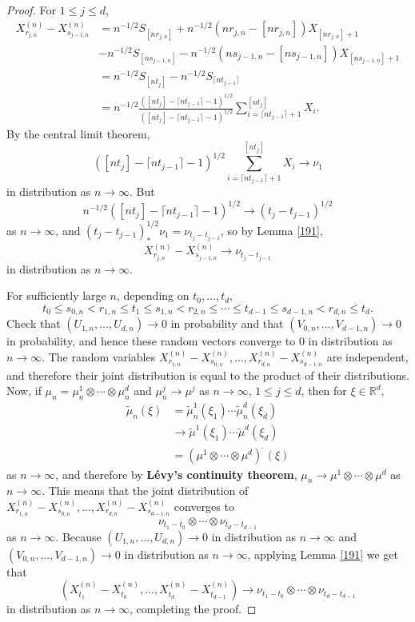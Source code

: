 \documentclass{article}
\theoremstyle{definition}
\theoremstyle{definition}
\begin{document}
\begin{proof}
For $1 \leq j \leq d$, 
\begin{align*}
X^{(n)}_{r_{j,n}} - X^{(n)}_{s_{j-1,n}} &= n^{-1/2} S_{[nr_{j,n}]} + n^{-1/2} (nr_{j,n} - [nr_{j,n}]) X_{[nr_{j,n}]+1}\\
&-n^{-1/2} S_{[ns_{j-1,n}]} - n^{-1/2} (ns_{j-1,n} - [ns_{j-1,n}]) X_{[ns_{j-1,n}]+1}\\
&=n^{-1/2} S_{[nt_j]} - n^{-1/2} S_{\lceil nt_{j-1} \rceil}\\
&=n^{-1/2} \frac{([nt_j] - \lceil nt_{j-1} \rceil - 1)^{1/2}}{([nt_j] - \lceil nt_{j-1} \rceil - 1)^{1/2}} \sum_{i=\lceil nt_{j-1} \rceil+1}^{[nt_j]} X_i.
\end{align*}
By the central limit theorem,
\[
([nt_j] - \lceil nt_{j-1} \rceil - 1)^{1/2}  \sum_{i=\lceil nt_{j-1} \rceil+1}^{[nt_j]} X_i \to \nu_1
\]
in distribution as $n \to \infty$.
But
\[
n^{-1/2} ([nt_j] - \lceil nt_{j-1} \rceil - 1)^{1/2} \to (t_j-t_{j-1})^{1/2}
\]
as $n \to \infty$, and $(t_j-t_{j-1})^{1/2}_* \nu_1 = \nu_{t_j-t_{j-1}}$, 
so by Lemma \ref{191},
\[
X^{(n)}_{r_{j,n}} - X^{(n)}_{s_{j-1,n}}  \to  \nu_{t_j-t_{j-1}}
\]
in distribution as $n \to \infty$. 


For sufficiently large $n$, depending on $t_0,\ldots,t_d$, 
\[
t_0 \leq s_{0,n} < r_{1,n} \leq t_1 \leq s_{1,n} < r_{2,n} \leq \cdots \leq t_{d-1} \leq s_{d-1,n}
<r_{d,n} \leq t_d.
\]
Check that $(U_{1,n},\ldots,U_{d,n}) \to 0$ in probability and that $(V_{0,n},\ldots,V_{d-1,n}) \to 0$ in probability, and hence
these random vectors converge  to $0$ in distribution as $n \to \infty$. 
The random variables $X^{(n)}_{r_{1,n}}-X^{(n)}_{s_{0,n}},
\ldots,X^{(n)}_{r_{d,n}}-X^{(n)}_{s_{d-1,n}}$ are independent,  and therefore their joint distribution is equal to the product of their
distributions. 
Now, if $\mu_n = \mu_n^1 \otimes \cdots \otimes \mu_n^d$ and $\mu_n^j \to \mu^j$ as $n \to \infty$, $1 \leq j \leq d$, then for $\xi \in \mathbb{R}^d$,
\begin{align*}
\widetilde{\mu}_n(\xi)&=\widetilde{\mu}_n^1(\xi_1) \cdots \widetilde{\mu}_n^d(\xi_d)\\
&\to \widetilde{\mu}^1(\xi_1) \cdots \widetilde{\mu}^d(\xi_d)\\
&=(\mu^1 \otimes \cdots \otimes \mu^d)^{\widetilde{\;}}(\xi)
\end{align*}
as $n \to \infty$, and therefore by \textbf{L\'evy's continuity theorem},
$\mu_n \to \mu^1 \otimes \cdots \otimes \mu^d$ as
$n \to \infty$.
This means that the joint distribution of $X^{(n)}_{r_{1,n}}-X^{(n)}_{s_{0,n}},
\ldots,X^{(n)}_{r_{d,n}}-X^{(n)}_{s_{d-1,n}}$ converges  to
\[
\nu_{t_1-t_0} \otimes \cdots \otimes \nu_{t_d-t_{d-1}}
\]
as $n \to \infty$. 
Because $(U_{1,n},\ldots,U_{d,n}) \to 0$ in distribution as $n \to \infty$ and $(V_{0,n},\ldots,V_{d-1,n}) \to 0$ in distribution as $n \to \infty$,
applying Lemma \ref{191} we get that 
\[
(X^{(n)}_{t_1} - X^{(n)}_{t_{0}},
\ldots,X^{(n)}_{t_d} - X^{(n)}_{t_{d-1}}) \to \nu_{t_1-t_0} \otimes \cdots \otimes \nu_{t_d-t_{d-1}}
\]
in distribution as $n \to \infty$, completing the proof.
\end{proof}
\end{document}
